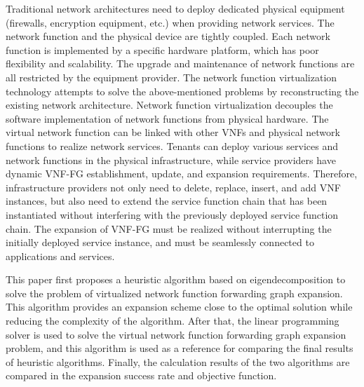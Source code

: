 \begin{eabstract}
  Traditional network architectures need to deploy dedicated physical equipment (firewalls, encryption equipment, etc.) when providing network services. The network function and the physical device are tightly coupled. Each network function is implemented by a specific hardware platform, which has poor flexibility and scalability. The upgrade and maintenance of network functions are all restricted by the equipment provider. The network function virtualization technology attempts to solve the above-mentioned problems by reconstructing the existing network architecture. Network function virtualization decouples the software implementation of network functions from physical hardware. The virtual network function can be linked with other VNFs and physical network functions to realize network services. Tenants can deploy various services and network functions in the physical infrastructure, while service providers have dynamic VNF-FG establishment, update, and expansion requirements. Therefore, infrastructure providers not only need to delete, replace, insert, and add VNF instances, but also need to extend the service function chain that has been instantiated without interfering with the previously deployed service function chain. The expansion of VNF-FG must be realized without interrupting the initially deployed service instance, and must be seamlessly connected to applications and services.\par
  This paper first proposes a heuristic algorithm based on eigendecomposition to solve the problem of virtualized network function forwarding graph expansion. This algorithm provides an expansion scheme close to the optimal solution while reducing the complexity of the algorithm. After that, the linear programming solver is used to solve the virtual network function forwarding graph expansion problem, and this algorithm is used as a reference for comparing the final results of heuristic algorithms. Finally, the calculation results of the two algorithms are compared in the expansion success rate and objective function.
\end{eabstract}
